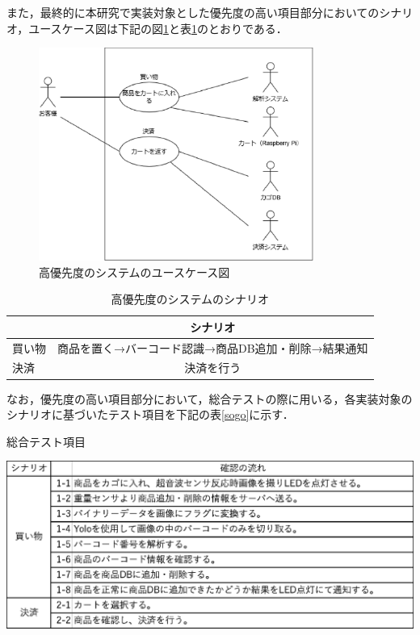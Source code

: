 また，最終的に本研究で実装対象とした優先度の高い項目部分においてのシナリオ，ユースケース図は下記の図\ref{use}と表\ref{sina}のとおりである．


\begin{figure}[htbp]
\centering
\includegraphics[width = 9cm]{./picture/usecase_saishu.eps}
\caption{高優先度のシステムのユースケース図}
\label{use}
\end{figure}

\begin{table}[htbp]
\begin{center}
\caption{高優先度のシステムのシナリオ}
\begin{tabular}{|l|c|} \hline
 & シナリオ \\ \hline \hline
買い物 & 商品を置く→バーコード認識→商品DB追加・削除→結果通知 \\
決済 & 決済を行う \\ \hline
\end{tabular}
\label{sina}
\end{center}
\end{table}

なお，優先度の高い項目部分において，総合テストの際に用いる，各実装対象のシナリオに基づいたテスト項目を下記の表\ref{sogo}に示す．

\begin{table}[htbp]
\centering
\caption{総合テスト項目}
\includegraphics[width = 15cm]{./picture/sogo.eps}
\label{sogo}
\end{table}

\newpage